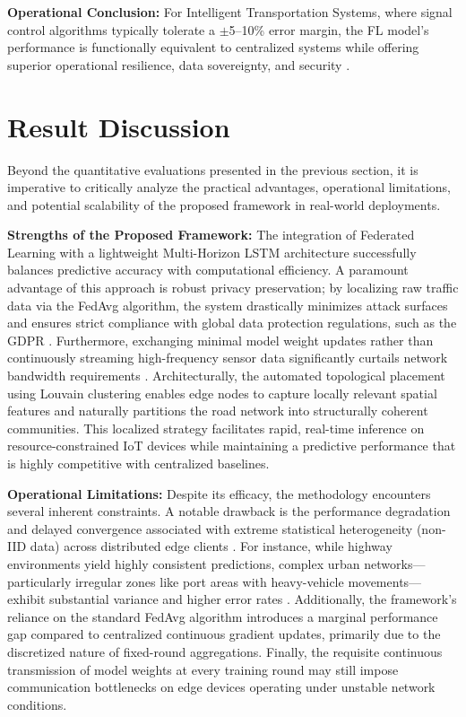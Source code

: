 \documentclass[pdflatex,sn-mathphys-num]{sn-jnl}
\theoremstyle{thmstyleone}
\theoremstyle{thmstyletwo}
\theoremstyle{thmstylethree}
\begin{document}
\textbf{Operational Conclusion:} For Intelligent Transportation Systems, where signal control algorithms typically tolerate a $\pm$5--10\% error margin, the FL model's performance is functionally equivalent to centralized systems while offering superior operational resilience, data sovereignty, and security \cite{tariq2024trustworthy,liu2020fedgru}.


\section{Result Discussion}

Beyond the quantitative evaluations presented in the previous section, it is imperative to critically analyze the practical advantages, operational limitations, and potential scalability of the proposed framework in real-world deployments.

\textbf{Strengths of the Proposed Framework:} The integration of Federated Learning with a lightweight Multi-Horizon LSTM architecture successfully balances predictive accuracy with computational efficiency. A paramount advantage of this approach is robust privacy preservation; by localizing raw traffic data via the FedAvg algorithm, the system drastically minimizes attack surfaces and ensures strict compliance with global data protection regulations, such as the GDPR \cite{gdpr2016}. Furthermore, exchanging minimal model weight updates rather than continuously streaming high-frequency sensor data significantly curtails network bandwidth requirements \cite{konecny2016federated}. Architecturally, the automated topological placement using Louvain clustering enables edge nodes to capture locally relevant spatial features and naturally partitions the road network into structurally coherent communities. This localized strategy facilitates rapid, real-time inference on resource-constrained IoT devices \cite{nguyen2021federated} while maintaining a predictive performance that is highly competitive with centralized baselines.

\textbf{Operational Limitations:} Despite its efficacy, the methodology encounters several inherent constraints. A notable drawback is the performance degradation and delayed convergence associated with extreme statistical heterogeneity (non-IID data) across distributed edge clients \cite{Zhao2018FederatedNonIID}. For instance, while highway environments yield highly consistent predictions, complex urban networks---particularly irregular zones like port areas with heavy-vehicle movements---exhibit substantial variance and higher error rates \cite{Meng2023LaneChanging}. Additionally, the framework's reliance on the standard FedAvg algorithm introduces a marginal performance gap compared to centralized continuous gradient updates, primarily due to the discretized nature of fixed-round aggregations. Finally, the requisite continuous transmission of model weights at every training round may still impose communication bottlenecks on edge devices operating under unstable network conditions.
\end{document}
